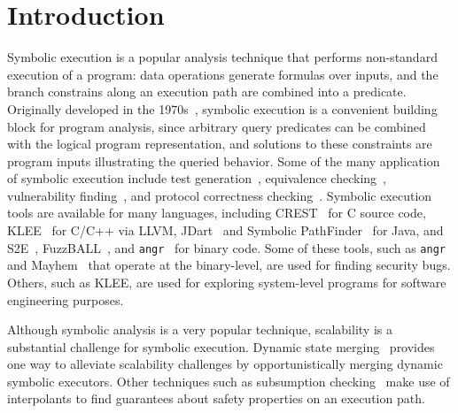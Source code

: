 \section{Introduction}
%
Symbolic execution is a popular analysis technique that performs non-standard execution of a program: data operations
generate formulas over inputs, and the branch constrains along an execution path are combined into a predicate.
%
Originally developed in the 1970s~\cite{King1976,Clarke1976}, symbolic execution is a convenient building block for
program analysis, since arbitrary query predicates can be combined with the logical program representation, and
solutions to these constraints are program inputs illustrating the queried behavior.
%
Some of the many application of symbolic execution include
test generation~\cite{dart,cute}, equivalence checking~\cite{ramos,adaptorsynth}, vulnerability finding~\cite{driller,angr}, and protocol correctness checking~\cite{transport}.
%
Symbolic execution tools are available for many languages, including
CREST~\cite{BurnimS2008} for C source code, KLEE~\cite{CadarDE2008}
for C/C++ via LLVM, JDart~\cite{jdart2016} and Symbolic
PathFinder~\cite{spf} for Java, and S2E~\cite{ChipounovKC2012},
FuzzBALL~\cite{BabicMMS2011}, and {\tt angr}~\cite{angr} for binary code.
%
Some of these tools, such as {\tt angr} and Mayhem~\cite{mayhem} that operate at the binary-level, are used for finding
security bugs.
%
Others, such as KLEE, are used for exploring system-level programs for software engineering purposes.


Although symbolic analysis is a very popular technique, scalability is a substantial challenge for symbolic execution.
%
Dynamic state merging~\cite{kuznetsov} provides one way to
alleviate scalability challenges by opportunistically merging dynamic
symbolic executors. %
%
Other techniques such as subsumption checking~\cite{Tian:2017:MEI:3155562.3155589} make use of interpolants to find
guarantees about safety properties on an execution path.
 

